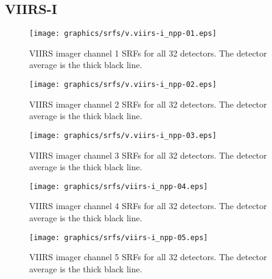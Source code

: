 \newpage
\subsection{VIIRS-I}
\begin{figure}[H]
  \centering
  \texttt{[image: graphics/srfs/v.viirs-i\_npp-01.eps]}
  \caption{VIIRS imager channel 1 SRFs for all 32 detectors. The detector average is the thick black line.}
  \label{fig:v.viirs-i_npp-01}
\end{figure}
\begin{figure}[H]
  \centering
  \texttt{[image: graphics/srfs/v.viirs-i\_npp-02.eps]}
  \caption{VIIRS imager channel 2 SRFs for all 32 detectors. The detector average is the thick black line.}
  \label{fig:v.viirs-i_npp-02}
\end{figure}
\begin{figure}[H]
  \centering
  \texttt{[image: graphics/srfs/v.viirs-i\_npp-03.eps]}
  \caption{VIIRS imager channel 3 SRFs for all 32 detectors. The detector average is the thick black line.}
  \label{fig:v.viirs-i_npp-03}
\end{figure}
\begin{figure}[H]
  \centering
  \texttt{[image: graphics/srfs/viirs-i\_npp-04.eps]}
  \caption{VIIRS imager channel 4 SRFs for all 32 detectors. The detector average is the thick black line.}
  \label{fig:viirs-i_npp-04}
\end{figure}
\begin{figure}[H]
  \centering
  \texttt{[image: graphics/srfs/viirs-i\_npp-05.eps]}
  \caption{VIIRS imager channel 5 SRFs for all 32 detectors. The detector average is the thick black line.}
  \label{fig:viirs-i_npp-05}
\end{figure}


\clearpage




%



